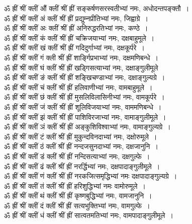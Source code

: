 \documentclass[twoside,top=1.7cm, bottom=1.7cm, outer=1cm,landscape, inner=1.5cm,a5paper,]{book}
\begin{document}
ॐ ह्रीं श्रीं क्लीं औं क्लीं श्रीं ह्रीं सङ्कर्षणसरस्वतीभ्यां नमः, अधोदन्तपङ्क्तौ~।\\
ॐ ह्रीं श्रीं क्लीं अं क्लीं श्रीं ह्रीं प्रद्युम्नप्रीतिभ्यां नमः, जिह्वाग्रे~।\\
ॐ ह्रीं श्रीं क्लीं अः क्लीं श्रीं ह्रीं अनिरुद्धरतिभ्यां नमः, कण्ठे~।\\
ॐ ह्रीं श्रीं क्लीं कं क्लीं श्रीं ह्रीं चक्रिजयाभ्यां नमः, दक्षबाहुमूले~।\\
ॐ ह्रीं श्रीं क्लीं खं क्लीं श्रीं ह्रीं गदिदुर्गाभ्यां नमः, दक्षकूर्परे~।\\
ॐ ह्रीं श्रीं क्लीं गं क्ली श्रीं ह्रीं शार्ङ्गिप्रभाभ्यां नमः, दक्षमणिबन्धे~।\\
ॐ ह्रीं श्रीं क्लीं घं क्लीं श्रीं ह्रीं खड्गिसत्याभ्यां नमः, दक्षाङ्गुलीमूले\\
ॐ ह्रीं श्रीं क्लीं ङं क्लीं श्रीं ह्रीं शङ्खिचण्डाभ्यां नमः, दक्षाङ्गुल्यग्रे~।\\
ॐ ह्रीं श्रीं क्लीं चं क्लीं श्रीं ह्रीं हलिवाणीभ्यां नमः, वामबाहुमूले~।\\
ॐ ह्रीं श्रीं क्लीं छं क्लीं श्रीं ह्रीं मुसलिविलासिनीभ्यां नमः, वामकूर्परे~।\\
ॐ ह्रीं श्रीं क्लीं जं क्लीं श्रीं ह्रीं शूलिविजयाभ्यां नमः, वाममणिबन्धे~।\\
ॐ ह्रीं श्रीं क्लीं झं क्लीं श्रीं ह्रीं पाशिविरजाभ्यां नमः, वामाङ्गुलीमूले~।\\
ॐ ह्रीं श्रीं क्लीं ञं क्लीं श्रीं ह्रीं अङ्कुशिविश्वाभ्यां नमः, वामाङ्गुल्यग्रे~।\\
ॐ ह्रीं श्रीं क्लीं टं क्लीं श्रीं ह्रीं मुकुन्दविनदाभ्यां नमः, दक्षोरुमूले~।\\
ॐ ह्रीं श्रीं क्लीं ठं क्लीं श्रीं ह्रीं नन्दजसुनदाभ्यां नमः, दक्षजानुनि~।\\
ॐ ह्रीं श्रीं क्लीं डं क्लीं श्रीं ह्रीं नन्दिसत्याभ्यां नमः, दक्षगुल्फे~।\\
ॐ ह्रीं श्रीं क्लीं ढं क्लीं श्रीं ह्रीं नरर्द्धिभ्यां नमः, दक्षपादाङ्गुलीमूले~।\\
ॐ ह्रीं श्रीं क्लीं णं क्लीं श्रीं ह्रीं नरकजित्समृद्धिभ्यां नमः दक्षपादाङ्गुल्यग्रे~।\\
ॐ ह्रीं श्रीं क्लीं तं क्लीं श्रीं ह्रीं हरिशुद्धिभ्यां नमः वामोरुमूले~।\\
ॐ ह्रीं श्रीं क्लीं थं क्लीं श्रीं ह्रीं कृष्णबुद्धिभ्यां नमः, वामजानुनि~।\\
ॐ ह्रीं श्रीं क्लीं दं क्लीं श्रीं ह्रीं सत्यभुक्तिभ्यां नमः, वामगुल्फे~।\\
ॐ ह्रीं श्रीं क्लीं धं क्लीं श्रीं ह्रीं सात्वतमतिभ्यां नमः, वामपादाङ्गुलीमूले~।\\
\end{document}

